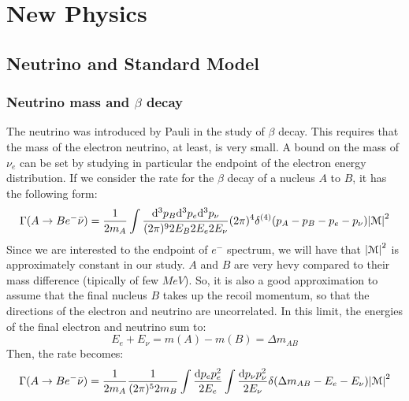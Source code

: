 \documentclass[../../main/main.tex]{subfiles}
\begin{document}
\chapter{New Physics}


\section{Neutrino and Standard Model}

\subsection{Neutrino mass and \( \beta \) decay}
The neutrino was introduced by Pauli in the study of \( \beta \) decay. This requires that the mass of the electron neutrino, at
least, is very small. A bound on the mass of \( \nu_e \) can be set by studying in particular the endpoint of the electron energy distribution. If we consider the rate for the \( \beta \) decay of a nucleus \( A \) to \( B \), it has the following form:
\begin{equation}
	\Gamma(A \rightarrow Be^-\bar{\nu})
	=
	\frac{1}{2m_A}
	\int \frac{\mathrm{d}{^3p_B} \mathrm{d}{^3p_e} \mathrm{d}{^3 p_{\nu}}}{(2\pi)^9 2E_B 2E_e 2E_{\nu}}
	(2\pi)^4 \delta^{(4)}(p_A - p_B - p_e - p_{\nu})
	\abs{\mathcal{M}}^2
	\label{eq:}
\end{equation}
Since we are interested to the endpoint of \( e^- \) spectrum, we will have that \( \abs{\mathcal{M}}^2 \) is approximately constant in our study. \( A \) and \( B \) are very hevy compared to their mass difference (tipically of few \( \si{MeV} \)). So, it is also a good approximation to assume that the final nucleus \( B \) takes up the recoil momentum, so that the directions of the electron and neutrino are uncorrelated. In this limit, the energies of the final electron and neutrino sum to:
\begin{equation}
	E_e + E_{\nu}
	=
	m(A) - m(B)
	=
	\Delta m_{AB}
	\label{eq:}
\end{equation}
Then, the rate becomes:
\begin{equation}
	\Gamma(A \rightarrow Be^-\bar{\nu})
	=
	\frac{1}{2m_A} \frac{1}{(2\pi)^5 2m_B}
	\int \frac{\mathrm{d}{p_e} p_e^2}{2E_e}
	\int \frac{\mathrm{d}{p_{\nu}} p_{\nu}^2}{2E_{\nu}}
	\delta(\Delta m_{AB} - E_e - E_{\nu})
	\abs{\mathcal{M}}^2
	\label{eq:}
\end{equation}
\end{document}
